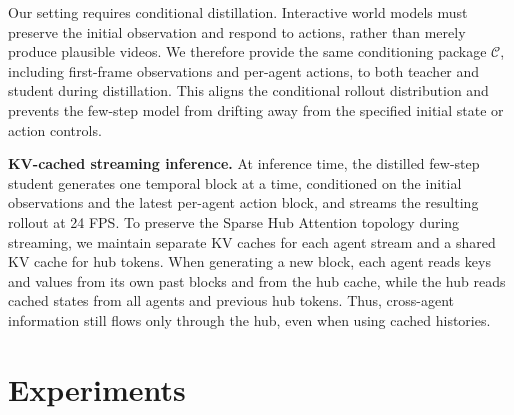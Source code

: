 \documentclass{llmxive}
\begin{document}
Our setting requires conditional distillation.
Interactive world models must preserve the initial observation and respond to actions, rather than merely produce plausible videos.
We therefore provide the same conditioning package $\mathcal{C}$, including first-frame observations and per-agent actions, to both teacher and student during distillation.
This aligns the conditional rollout distribution and prevents the few-step model from drifting away from the specified initial state or action controls.

\noindent\textbf{KV-cached streaming inference.}
At inference time, the distilled few-step student generates one temporal block at a time, conditioned on the initial observations and the latest per-agent action block, and streams the resulting rollout at 24 FPS.
To preserve the Sparse Hub Attention topology during streaming, we maintain separate KV caches for each agent stream and a shared KV cache for hub tokens.
When generating a new block, each agent reads keys and values from its own past blocks and from the hub cache, while the hub reads cached states from all agents and previous hub tokens.
Thus, cross-agent information still flows only through the hub, even when using cached histories.

\section{Experiments}
\label{sec:experiments}
\end{document}
